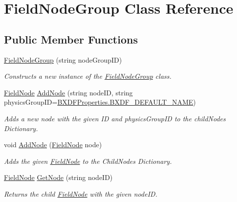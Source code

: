 \hypertarget{class_field_node_group}{}\section{Field\+Node\+Group Class Reference}
\label{class_field_node_group}
\subsection*{Public Member Functions}
\begin{DoxyCompactItemize}
\item 
\hyperlink{class_field_node_group_ad8e8912ee75dc63292ea2b65bf5034c5}{Field\+Node\+Group} (string node\+Group\+ID)
\begin{DoxyCompactList}\small\item\em Constructs a new instance of the \hyperlink{class_field_node_group}{Field\+Node\+Group} class. \end{DoxyCompactList}\item 
\hyperlink{class_field_node}{Field\+Node} \hyperlink{class_field_node_group_afb8a937c5cafe84b04c29b87a5543f5e}{Add\+Node} (string node\+ID, string physics\+Group\+ID=\hyperlink{class_b_x_d_f_properties_a528bb431080585f72f9f74bd44a23932}{B\+X\+D\+F\+Properties.\+B\+X\+D\+F\+\_\+\+D\+E\+F\+A\+U\+L\+T\+\_\+\+N\+A\+ME})
\begin{DoxyCompactList}\small\item\em Adds a new node with the given ID and physics\+Group\+ID to the child\+Nodes Dictionary. \end{DoxyCompactList}\item 
void \hyperlink{class_field_node_group_a28cf2a8b3f3bf5f98146d8ade421bdb7}{Add\+Node} (\hyperlink{class_field_node}{Field\+Node} node)
\begin{DoxyCompactList}\small\item\em Adds the given \hyperlink{class_field_node}{Field\+Node} to the Child\+Nodes Dictionary. \end{DoxyCompactList}\item 
\hyperlink{class_field_node}{Field\+Node} \hyperlink{class_field_node_group_a9eb2f827c87d034f403cbde900e2e1c7}{Get\+Node} (string node\+ID)
\begin{DoxyCompactList}\small\item\em Returns the child \hyperlink{class_field_node}{Field\+Node} with the given node\+ID. \end{DoxyCompactList}\item 

\end{DoxyCompactItemize}
